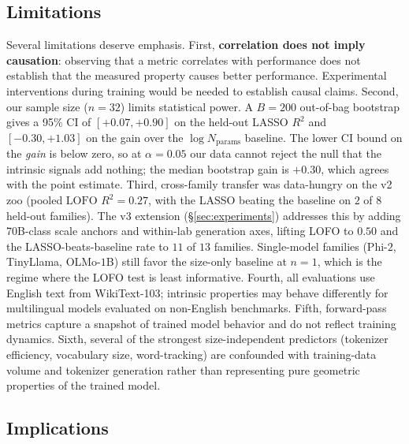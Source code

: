 \documentclass[preprint]{neurips_2025}
\begin{document}
\subsection{Limitations}

Several limitations deserve emphasis.
First, \textbf{correlation does not imply causation}: observing that a metric correlates with performance does not establish that the measured property causes better performance.
Experimental interventions during training would be needed to establish causal claims.
Second, our sample size ($n = 32$) limits statistical power. A $B = 200$ out-of-bag bootstrap gives a 95\% CI of $[+0.07, +0.90]$ on the held-out LASSO $R^2$ and $[-0.30, +1.03]$ on the gain over the $\log N_{\text{params}}$ baseline. The lower CI bound on the \emph{gain} is below zero, so at $\alpha = 0.05$ our data cannot reject the null that the intrinsic signals add nothing; the median bootstrap gain is $+0.30$, which agrees with the point estimate.
Third, cross-family transfer was data-hungry on the v2 zoo (pooled $\text{LOFO } R^2 = 0.27$, with the LASSO beating the baseline on $2$ of $8$ held-out families). The v3 extension (\S\ref{sec:experiments}) addresses this by adding 70B-class scale anchors and within-lab generation axes, lifting LOFO to $0.50$ and the LASSO-beats-baseline rate to $11$ of $13$ families. Single-model families (Phi-$2$, TinyLlama, OLMo-$1$B) still favor the size-only baseline at $n = 1$, which is the regime where the LOFO test is least informative.
Fourth, all evaluations use English text from WikiText-103; intrinsic properties may behave differently for multilingual models evaluated on non-English benchmarks.
Fifth, forward-pass metrics capture a snapshot of trained model behavior and do not reflect training dynamics.
Sixth, several of the strongest size-independent predictors (tokenizer efficiency, vocabulary size, word-tracking) are confounded with training-data volume and tokenizer generation rather than representing pure geometric properties of the trained model.

\subsection{Implications}
\end{document}
